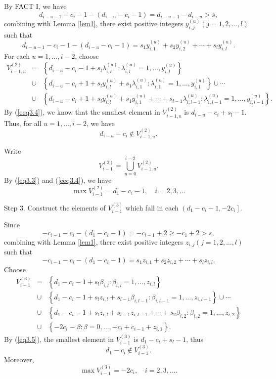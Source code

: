 \documentclass[12pt]{article}
\numberwithin{equation}{section}
\begin{document}
By FACT I, we have
$$d_{i-u-1}-c_{i}-1-\left(d_{i-u}-c_{i}-1\right)=d_{i-u-1}-d_{i-u}>s,$$
combining with Lemma \ref{lem1}, there exist positive integers $y_{i,j}^{(u)}(j=1,2,\ldots,l)$ such that
$$d_{i-u-1}-c_{i}-1-\left(d_{i-u}-c_{i}-1\right)=s_1y_{i,1}^{(u)}+s_2y_{i,2}^{(u)}+\cdots+s_ly_{i,l}^{(u)}.$$
For each $u=1,\ldots,i-2$, choose \begin{eqnarray}\label{eeq3.4}V_{i-1,u}^{(2)}&=&\left\{d_{i-u}-c_{i}-1+s_l\lambda_{i,l}^{(u)}: \lambda_{i,l}^{(u)}=1,\ldots,y_{i,l}^{(u)}\right\}
\\&\cup&\left\{d_{i-u}-c_{i}+1+s_l y_{i,l}^{(u)}+s_1\lambda_{i,1}^{(u)}: \lambda_{i,1}^{(u)}=1,\ldots,y_{i,1}^{(u)}\right\}\cup\cdots\nonumber
\\&\cup&\left\{d_{i-u}-c_{i}+1+s_l y_{i,l}^{(u)}+s_1 y_{i,1}^{(u)}+\cdots+s_{l-1} \lambda_{i,l-1}^{(u)}: \lambda_{i,l-1}^{(u)}=1,\ldots,y_{i,l-1}^{(u)}\right\}.\nonumber\end{eqnarray}
By (\ref{eeq3.4}), we know that the smallest element in $V_{i-1,u}^{(2)}$ is $d_{i-u}-c_{i}+s_l-1$. Thus, for all $u=1,\ldots, i-2$, we have
\begin{equation}\label{Prop-2} d_{i-u}-c_{i}\notin V_{i-1,u}^{(2)}.\tag{Prop-2}\end{equation}

Write $$V_{i-1}^{(2)}=\bigcup\limits_{u=0}^{i-2}V_{i-1,u}^{(2)}.$$
By (\ref{eq3.3}) and (\ref{eeq3.4}), we have $$\max V_{i-1}^{(2)}=d_1-c_i-1, \quad i=2,3,\ldots$$

Step 3. Construct the elements of $V_{i-1}^{(3)}$ which fall in each $\left(d_1-c_i-1, -2c_{i}\right]$.

Since
$$-c_{i-1}-c_{i}-(d_1-c_{i}-1)=-c_{i-1}+2\geqslant -c_1+2>s,$$
combining with Lemma \ref{lem1}, there exist positive integers $z_{i,j}(j=1,2,\ldots,l)$ such that
$$-c_{i-1}-c_{i}-(d_1-c_{i}-1)=s_1z_{i,1}+s_2z_{i,2}+\cdots+s_lz_{i,l}.$$
Choose \begin{eqnarray}\label{eq3.5}V_{i-1}^{(3)}&=&\left\{d_1-c_i-1+s_l\beta_{i,l}:\beta_{i,l}=1,\ldots,z_{i,l}\right\}
\\&\cup&\left\{d_1-c_i-1+s_l z_{i,l}+s_{l-1}\beta_{i,l-1}:\beta_{i,l-1}=1,\ldots,z_{i,l-1}\right\}\cup \cdots\nonumber
\\ &\cup&\left\{d_1-c_i-1+s_l z_{i,l}+s_{l-1}z_{i,l-1}+\cdots+s_{2}\beta_{i,2}: \beta_{i,2}=1,\ldots,z_{i,2}\right\}\nonumber
\\&\cup&\left\{-2c_{i}-\beta: \beta=0,\ldots,-c_{i}+c_{i-1}+z_{i,1}\right\}.\nonumber\end{eqnarray}
By (\ref{eq3.5}), the smallest element in $V_{i-1}^{(3)}$ is $d_{1}-c_{i}+s_l-1$, thus
\begin{equation}\label{Prop-3} d_{1}-c_{i}\notin V_{i-1}^{(3)}.\tag{Prop-3}\end{equation}
Moreover, $$\max V_{i-1}^{(3)}=-2c_{i}, \quad i=2,3,\ldots.$$
\end{document}
